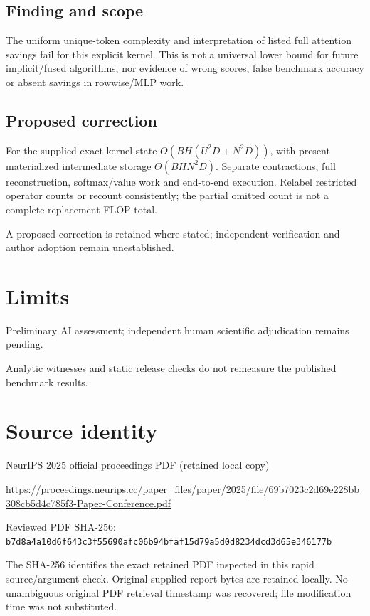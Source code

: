 \documentclass[11pt]{article}
\begin{document}
\subsection*{Finding and scope}

The uniform unique-token complexity and interpretation of listed full attention savings fail for this explicit kernel. This is not a universal lower bound for future implicit/fused algorithms, nor evidence of wrong scores, false benchmark accuracy or absent savings in rowwise/MLP work.

\subsection*{Proposed correction}

For the supplied exact kernel state \(O(BH(U^2D+N^2D))\), with present materialized intermediate storage \(\Theta(BHN^2D)\). Separate contractions, full reconstruction, softmax/value work and end-to-end execution. Relabel restricted operator counts or recount consistently; the partial omitted count is not a complete replacement FLOP total.

A proposed correction is retained where stated; independent verification and author adoption remain unestablished.

\section*{Limits}

Preliminary AI assessment; independent human scientific adjudication remains pending.\par

Analytic witnesses and static release checks do not remeasure the published benchmark results.\par

\section*{Source identity}

NeurIPS 2025 official proceedings PDF (retained local copy)

\url{https://proceedings.neurips.cc/paper_files/paper/2025/file/69b7023c2d69e228bb308cb5d4c785f3-Paper-Conference.pdf}

Reviewed PDF SHA-256: \nolinkurl{b7d8a4a10d6f643c3f55690afc06b94bfaf15d79a5d0d8234dcd3d65e346177b}

The SHA-256 identifies the exact retained PDF inspected in this rapid source/argument check. Original supplied report bytes are retained locally. No unambiguous original PDF retrieval timestamp was recovered; file modification time was not substituted.
\end{document}
